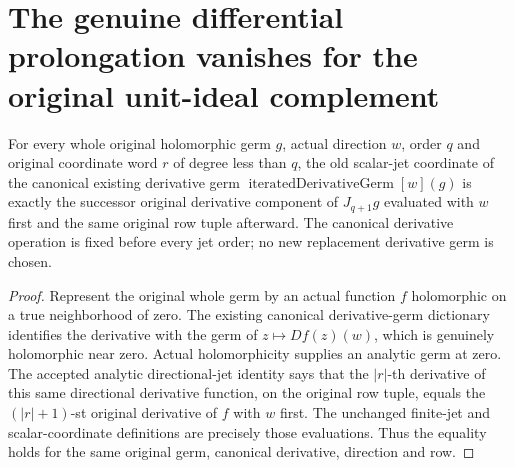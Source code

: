 \section{The genuine differential prolongation vanishes for the original unit-ideal complement}

\begin{theorem}
\label{hir:actual-canonical-directional-germ-successor-scalar-jet}
\leanok
For every whole original holomorphic germ $g$, actual direction $w$,
order $q$ and original coordinate word $r$ of degree less than $q$,
the old scalar-jet coordinate of the canonical existing derivative
germ $\operatorname{iteratedDerivativeGerm}[w](g)$ is exactly the
successor original derivative component of $J_{q+1}g$ evaluated with
$w$ first and the same original row tuple afterward. The canonical
derivative operation is fixed before every jet order; no new
replacement derivative germ is chosen.
\end{theorem}
\begin{proof}
Represent the original whole germ by an actual function $f$
holomorphic on a true neighborhood of zero. The existing canonical
derivative-germ dictionary identifies the derivative with the germ
of $z\mapsto Df(z)(w)$, which is genuinely holomorphic near zero.
Actual holomorphicity supplies an analytic germ at zero. The accepted
analytic directional-jet identity says that the $|r|$-th derivative
of this same directional derivative function, on the original row
tuple, equals the $(|r|+1)$-st original derivative of $f$ with $w$
first. The unchanged finite-jet and scalar-coordinate definitions
are precisely those evaluations. Thus the equality holds for the
same original germ, canonical derivative, direction and row.
\end{proof}

